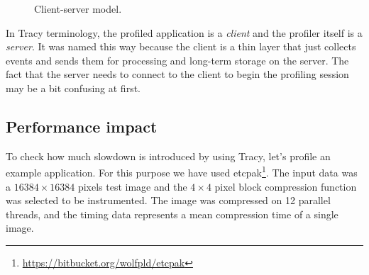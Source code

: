 \documentclass[hidelinks,titlepage,a4paper]{article}
\begin{document}
\begin{figure}[h]
\centering{}
\caption{Client-server model.}
\label{clientserver}
\end{figure}

In Tracy terminology, the profiled application is a \emph{client} and the profiler itself is a \emph{server}. It was named this way because the client is a thin layer that just collects events and sends them for processing and long-term storage on the server. The fact that the server needs to connect to the client to begin the profiling session may be a bit confusing at first.

\subsection{Performance impact}
\label{perfimpact}

To check how much slowdown is introduced by using Tracy, let's profile an example application. For this purpose we have used etcpak\footnote{\url{https://bitbucket.org/wolfpld/etcpak}}. The input data was a $16384 \times 16384$ pixels test image and the $4 \times 4$ pixel block compression function was selected to be instrumented. The image was compressed on 12 parallel threads, and the timing data represents a mean compression time of a single image.
\end{document}
